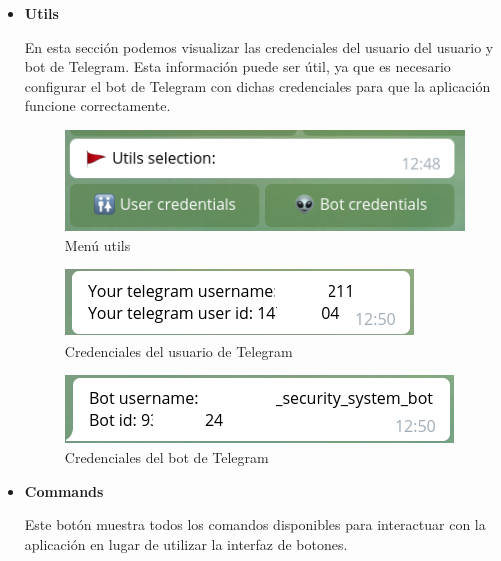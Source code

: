 \begin{itemize}
\item \textbf{Utils}

En esta sección podemos visualizar las credenciales del usuario del usuario y bot de Telegram. Esta información puede ser útil, ya que es necesario configurar el bot de Telegram con dichas credenciales para que la aplicación funcione correctamente.

\begin{figure}[H]
	\centering
	\includegraphics[scale=0.55]{images/79}
	\caption{Menú utils}
\end{figure}

\begin{figure}[H]
	\centering
	\includegraphics[scale=0.55]{images/80}
	\caption{Credenciales del usuario de Telegram}
\end{figure}

\begin{figure}[H]
	\centering
	\includegraphics[scale=0.55]{images/81}
	\caption{Credenciales del bot de Telegram}
\end{figure}


\item \textbf{Commands}

Este botón muestra todos los comandos disponibles para interactuar con la aplicación en lugar de utilizar la interfaz de botones.


\end{itemize}
